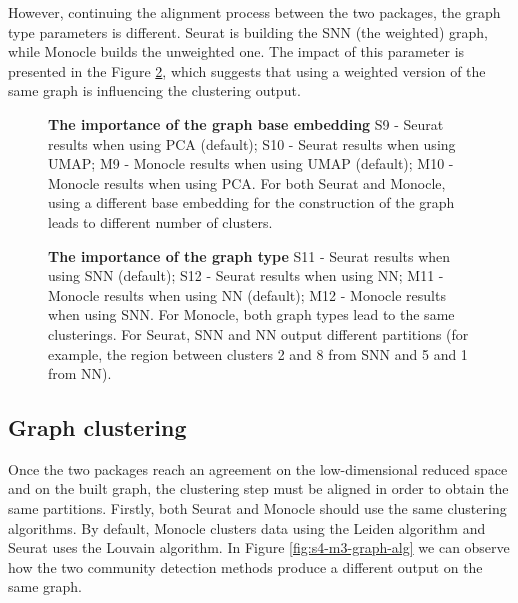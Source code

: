 However, continuing the alignment process between the two packages, the graph type parameters is different. Seurat is building the SNN (the weighted) graph, while Monocle builds the unweighted one. The impact of this parameter is presented in the Figure \ref{fig:s4-m3-n-graph-type}, which suggests that using a weighted version of the same graph is influencing the clustering output.

\begin{landscape}
\begin{figure}[H]
    \centering
    \caption{\label{fig:s4-m3-graph-base}\textbf{The importance of the graph base embedding} S9 - Seurat results when using PCA (default); S10 - Seurat results when using UMAP; M9 - Monocle results when using UMAP (default); M10 - Monocle results when using PCA. For both Seurat and Monocle, using a different base embedding for the construction of the graph leads to different number of clusters.}
\end{figure}

\begin{figure}[H]
    \centering
    \caption{\label{fig:s4-m3-n-graph-type}\textbf{The importance of the graph type} S11 - Seurat results when using SNN (default); S12 - Seurat results when using NN; M11 - Monocle results when using NN (default); M12 - Monocle results when using SNN. For Monocle, both graph types lead to the same clusterings. For Seurat, SNN and NN output different partitions (for example, the region between clusters 2 and 8 from SNN and 5 and 1 from NN).}
\end{figure}
\end{landscape}

\subsection{Graph clustering}
Once the two packages reach an agreement on the low-dimensional reduced space and on the built graph, the clustering step must be aligned in order to obtain the same partitions. Firstly, both Seurat and Monocle should use the same clustering algorithms. By default, Monocle clusters data using the Leiden algorithm and Seurat uses the Louvain algorithm. In Figure \ref{fig:s4-m3-graph-alg} we can observe how the two community detection methods produce a different output on the same graph.

